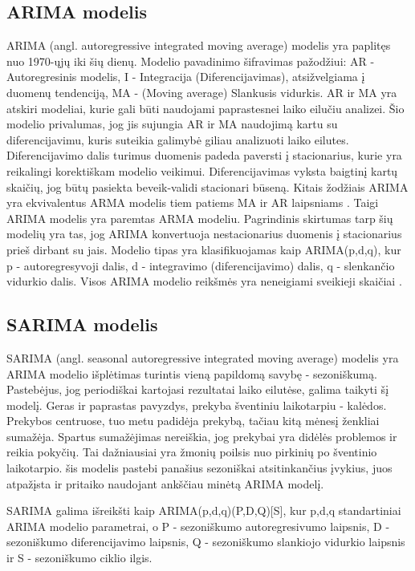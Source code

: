 \documentclass{VUMIFInfKursinis}
\begin{document}
\subsection {ARIMA modelis}
ARIMA (angl. autoregressive integrated moving average) modelis yra paplitęs nuo 1970-ųjų iki šių dienų. Modelio pavadinimo šifravimas
pažodžiui: AR - Autoregresinis modelis, I - Integracija (Diferencijavimas), atsižvelgiama į duomenų tendenciją, MA - (Moving average) Slankusis vidurkis.
AR ir MA yra atskiri modeliai, kurie gali būti naudojami paprastesnei laiko eilučiu analizei. Šio modelio privalumas, jog jis sujungia AR ir MA naudojimą kartu su
diferencijavimu, kuris suteikia galimybė giliau analizuoti laiko eilutes. Diferencijavimo dalis turimus duomenis padeda paversti į stacionarius, 
kurie yra reikalingi korektiškam modelio veikimui. Diferencijavimas vyksta baigtinį kartų skaičių, jog būtų pasiekta beveik-validi stacionari būseną. 
Kitais žodžiais ARIMA yra ekvivalentus ARMA modelis tiem patiems MA ir AR laipsniams \cite{hua2020bitcoin}. Taigi ARIMA modelis yra paremtas ARMA modeliu. 
Pagrindinis skirtumas tarp šių modelių yra tas, jog ARIMA konvertuoja nestacionarius duomenis į stacionarius prieš dirbant su jais. Modelio tipas yra 
klasifikuojamas kaip ARIMA(p,d,q), kur p - autoregresyvoji dalis, d - integravimo (diferencijavimo) dalis, q - slenkančio vidurkio dalis. Visos ARIMA modelio
reikšmės yra neneigiami sveikieji skaičiai \cite{mondal2014study}.

\subsection {SARIMA modelis}
SARIMA (angl. seasonal autoregressive integrated moving average) modelis yra ARIMA modelio išplėtimas turintis vieną papildomą savybę - sezoniškumą\cite{carl2020ethereum}. 
Pastebėjus, jog periodiškai kartojasi rezultatai laiko eilutėse, galima taikyti šį modelį. Geras ir paprastas pavyzdys, prekyba šventiniu laikotarpiu - kalėdos.
Prekybos centruose, tuo metu padidėja prekybą, tačiau kitą mėnesį ženkliai sumažėja. Spartus sumažėjimas nereiškia, jog prekybai yra didėlės problemos ir reikia pokyčių.
Tai dažniausiai yra žmonių poilsis nuo pirkinių po šventinio laikotarpio. šis modelis pastebi panašius sezoniškai atsitinkančius įvykius, juos atpažįsta ir pritaiko naudojant
ankščiau minėtą ARIMA modelį.

SARIMA galima išreikšti kaip ARIMA(p,d,q)(P,D,Q)[S], kur p,d,q standartiniai ARIMA modelio parametrai, o P - sezoniškumo autoregresivumo laipsnis,
D - sezoniškumo diferencijavimo laipsnis, Q - sezoniškumo slankiojo vidurkio laipsnis ir S - sezoniškumo ciklio ilgis. 
\end{document}
